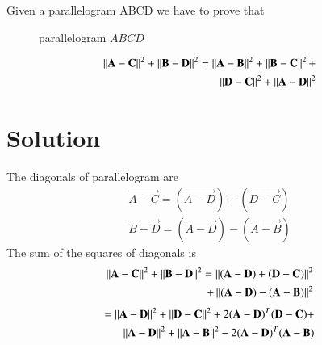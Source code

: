 
Given a parallelogram ABCD we have to prove that
\begin{figure}[!ht]
	\centering
	\resizebox{\columnwidth}{!}{}
	\caption{parallelogram ${ABCD}$}
	\label{eq:solutions/1/101/fig1:Parallelogram}
\end{figure}
	
\begin{align}\label{eq:solutions/1/101/eq:1}
    	\left\lVert\mathbf{A-C}\right\rVert^2 + \left\lVert\mathbf{B-D}\right\rVert^2 = \nonumber  \left\lVert\mathbf{A-B}\right\rVert^2+\left\lVert\mathbf{B-C}\right\rVert^2+\\\left\lVert\mathbf{D-C}\right\rVert^2+\left\lVert\mathbf{A-D}\right\rVert^2
\end{align}

\section{Solution}
 The diagonals of  parallelogram are
\begin{align}
	\vec{A-C} = (\vec{A-D}) +(\vec{D-C})\\
	\vec{B-D} = (\vec{A-D}) -(\vec{A-B})
\end{align} 
The sum  of the squares of diagonals is
\begin{align}
\left\lVert\mathbf{A-C}\right\rVert^2 +\left\lVert\mathbf{B-D}\right\rVert^2 = \nonumber  
\left\lVert(\mathbf{A-D}) +(\mathbf{D-C})\right\rVert^2\\+ \left\lVert(\mathbf{A-D}) -(\mathbf{A-B})\right\rVert^2
\end{align}
\begin{align}
=\left\lVert\mathbf{A-D}\right\rVert^2 +\left\lVert\mathbf{D-C}\right\rVert^2 + 2{(\mathbf{A-D})}^T{(\mathbf{D-C})} + \nonumber 
\\\left\lVert\mathbf{A-D}\right\rVert^2+\left\lVert\mathbf{A-B}\right\rVert^2-2{(\mathbf{A-D})}^T{(\mathbf{A-B})}\label{eq:solutions/1/101/eq:2}
\end{align}

